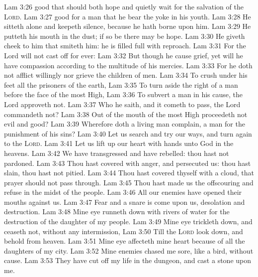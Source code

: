 \vs Lam 3:26  good that  should both hope and quietly wait for the salvation of the \textsc{Lord}.
\vs Lam 3:27  good for a man that he bear the yoke in his youth.
\vs Lam 3:28 He sitteth alone and keepeth silence, because he hath borne  upon him.
\vs Lam 3:29 He putteth his mouth in the dust; if so be there may be hope.
\vs Lam 3:30 He giveth  cheek to him that smiteth him: he is filled full with reproach.
\vs Lam 3:31 For the Lord will not cast off for ever:
\vs Lam 3:32 But though he cause grief, yet will he have compassion according to the multitude of his mercies.
\vs Lam 3:33 For he doth not afflict willingly nor grieve the children of men.
\vs Lam 3:34 To crush under his feet all the prisoners of the earth,
\vs Lam 3:35 To turn aside the right of a man before the face of the most High,
\vs Lam 3:36 To subvert a man in his cause, the Lord approveth not.
\vs Lam 3:37 Who  he  saith, and it cometh to pass,  the Lord commandeth  not?
\vs Lam 3:38 Out of the mouth of the most High proceedeth not evil and good?
\vs Lam 3:39 Wherefore doth a living man complain, a man for the punishment of his sins?
\vs Lam 3:40 Let us search and try our ways, and turn again to the \textsc{Lord}.
\vs Lam 3:41 Let us lift up our heart with  hands unto God in the heavens.
\vs Lam 3:42 We have transgressed and have rebelled: thou hast not pardoned.
\vs Lam 3:43 Thou hast covered with anger, and persecuted us: thou hast slain, thou hast not pitied.
\vs Lam 3:44 Thou hast covered thyself with a cloud, that  prayer should not pass through.
\vs Lam 3:45 Thou hast made us  the offscouring and refuse in the midst of the people.
\vs Lam 3:46 All our enemies have opened their mouths against us.
\vs Lam 3:47 Fear and a snare is come upon us, desolation and destruction.
\vs Lam 3:48 Mine eye runneth down with rivers of water for the destruction of the daughter of my people.
\vs Lam 3:49 Mine eye trickleth down, and ceaseth not, without any intermission,
\vs Lam 3:50 Till the \textsc{Lord} look down, and behold from heaven.
\vs Lam 3:51 Mine eye affecteth mine heart because of all the daughters of my city.
\vs Lam 3:52 Mine enemies chased me sore, like a bird, without cause.
\vs Lam 3:53 They have cut off my life in the dungeon, and cast a stone upon me.
